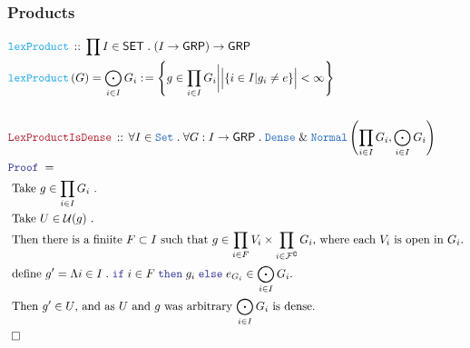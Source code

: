 \documentclass[12pt]{scrartcl}
\newcommand{\TYPE}[1]{\textcolor{NavyBlue}{\mathtt{#1}}}
\newcommand{\FUNC}[1]{\textcolor{Cerulean}{\mathtt{#1}}}
\newcommand{\LOGIC}[1]{\textcolor{Blue}{\mathtt{#1}}}
\newcommand{\THM}[1]{\textcolor{Maroon}{\mathtt{#1}}}
\renewcommand{\.}{\; . \;}
\newcommand{\de}{: \kern 0.1pc =}
\newcommand{\If}{\LOGIC{if} \;}
\newcommand{\Then}{ \; \LOGIC{then} \;}
\newcommand{\Else}{\; \LOGIC{else} \;}
\newcommand{\Act}[1]{\left( #1 \right)}
\newcommand{\Theorem}[2]{& \THM{#1} \, :: \, #2 \\ & \Proof = \\ }
\newcommand{\DeclareFunc}[2]{& \FUNC{#1} \, :: \, #2 \\}
\newcommand{\DefineNamedFunc}[4]{&  \FUNC{#1}\Act{#2} = #3 \de #4 \\}
\newcommand{\Page}[1]{ \begin{align*} #1 \end{align*}   }
\newcommand{\Explain}[1]{& \text{#1.} \\}
\renewcommand{\And}{\; \& \;}
\newcommand{\Set}{\TYPE{Set}}
\renewcommand{\c}{\complement}
\newcommand{\QED}{\; \square}
\newcommand{\EndProof}{& \QED \\}
\newcommand{\Proof}{\LOGIC{Proof} \; }
\newcommand{\SET}{\mathsf{SET}}
\newcommand{\Dense}{\TYPE{Dense}}
\renewcommand{\U}{\mathcal{U}}
\newcommand{\F}{\mathcal{F}}
\newcommand{\GRP}{\mathsf{GRP}}
\begin{document}
\subsubsection{Products}
\Page{
	\DeclareFunc{lexProduct}
	{
		\prod I \in \SET \. (I \to \GRP) \to \GRP
	}
	\DefineNamedFunc{lexProduct}{G}{\bigodot_{i \in I} G_i }
	{
		\left\{ g \in \prod_{i \in I} G_i \bigg|  \Big| \{ i \in I | g_i \neq e  \} \Big| < \infty   \right\}
	}
	\\
	\Theorem{LexProductIsDense}
	{
		\forall I \in \Set \.
		\forall G  : I \to \GRP \.
		\Dense \And \TYPE{Normal}\left( \prod_{i \in I} G_i, \bigodot_{i\in I} G_i \right)
	}
	\Explain{
		Take $g \in \prod_{i \in I} G_i$ }
	\Explain{
		Take $U \in \U(g)$
	}
	\Explain{
		Then there is a finiite $F \subset I$ such that 
		$g \in \prod_{i \in F} V_i \times \prod_{i \in \F^\c} G_i$,
		where each $V_i$ is open  in $G_i$}
	\Explain{
		define $g' = \Lambda i \in I \. \If i \in F \Then g_i \Else e_{G_i} \in \bigodot_{i \in I} G_i$}
	\Explain{
		Then $g' \in U$, and as $U$ and $g$ was arbitrary 
		$\bigodot_{i \in I} G_i$ is dense}
	\EndProof
}
\newpage
\end{document}
